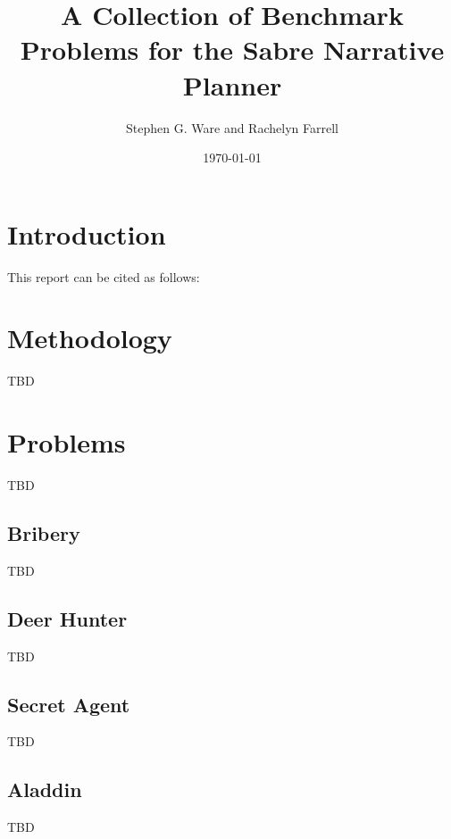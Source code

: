 \documentclass{nilreport}
\title{A Collection of Benchmark Problems for the Sabre Narrative Planner}
\author{Stephen G. Ware and Rachelyn Farrell}
\date{\today}
\begin{document}
\maketitle

\tableofcontents

\newpage


\section{Introduction}

This report can be cited as follows:

\begin{quote}
\end{quote}

\section{Methodology}

TBD

\section{Problems}

TBD

\subsection{Bribery}

TBD

\subsection{Deer Hunter}

TBD

\subsection{Secret Agent}

TBD

\subsection{Aladdin}

TBD
\end{document}
